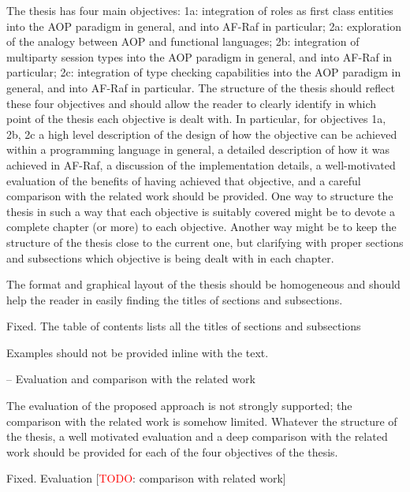 \documentclass{article}
\newcommand{\todo}[1]{[\textcolor{red}{TODO}: #1]}
\newenvironment{them}{\noindent\begingroup\color{blue}}{\endgroup\par}
\begin{document}
\begin{them}

The thesis has four main objectives: 1a: integration of roles as first class entities into the AOP paradigm in general, and into AF-Raf in particular; 2a: exploration of the analogy between AOP and functional languages; 2b: integration of multiparty session types into the AOP paradigm in general, and into AF-Raf in particular; 2c: integration of type checking capabilities into the AOP paradigm in general, and into AF-Raf in particular.
The structure of the thesis should reflect these four objectives and should allow the reader to clearly identify in which point of the thesis each objective is dealt with. In particular, for objectives 1a, 2b, 2c a high level description of the design of how the objective can be achieved within a programming language in general, a detailed description of how it was achieved in AF-Raf, a discussion of the implementation details, a well-motivated evaluation of the benefits of having achieved that objective, and a careful comparison with the related work should be provided.
One way to structure the thesis in such a way that each objective is suitably covered might be to devote a complete chapter (or more) to each objective. Another way might be to keep the structure of the thesis close to the current one, but clarifying with proper sections and subsections which objective is being dealt with in each chapter.
\end{them}
\todo{clarify this}

\begin{them}

The format and graphical layout of the thesis should be homogeneous and should help the reader in easily finding the titles of sections and subsections.
\end{them}
Fixed. The table of contents lists all the titles of sections and subsections

\begin{them}

 Examples should not be provided inline with the text.
\end{them}
\todo{I have no idea what you mean!}

\begin{them}

-- Evaluation and comparison with the related work

The evaluation of the proposed approach is not strongly supported; the comparison with the related work is somehow limited. Whatever the structure of the thesis, a well motivated evaluation and a deep comparison with the related work should be provided for each of the four objectives of the
thesis.
\end{them}
Fixed. Evaluation
\todo{comparison with related work}
\end{document}
